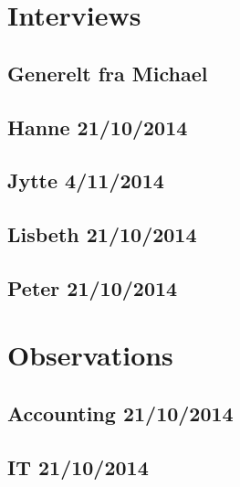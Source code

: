 \chapter{Interviews}
\label{app:interviews}
\section{Generelt fra Michael}

\section{Hanne 21/10/2014}

\section{Jytte 4/11/2014}

\section{Lisbeth 21/10/2014}

\section{Peter 21/10/2014}

\chapter{Observations}
\section{Accounting 21/10/2014}

\section{IT 21/10/2014}
